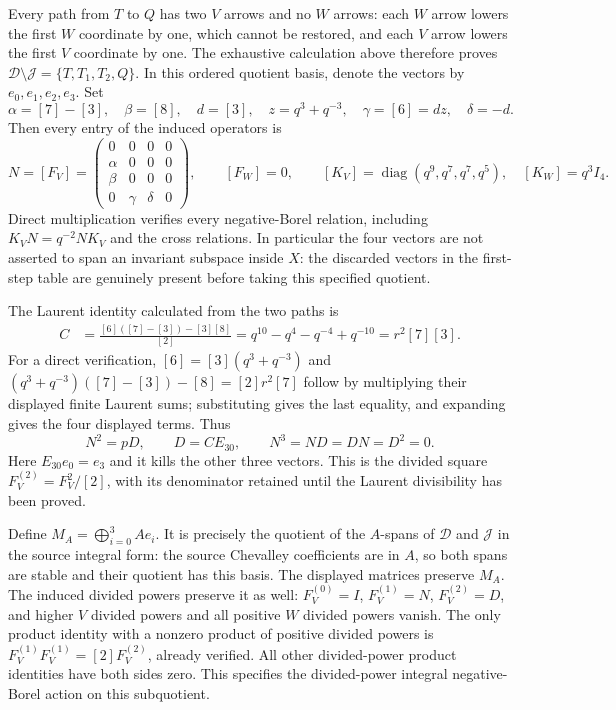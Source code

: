 Every path from $T$ to $Q$ has two $V$ arrows and no $W$ arrows:
each $W$ arrow lowers the first $W$ coordinate by one, which cannot
be restored, and each $V$ arrow lowers the first $V$ coordinate by
one. The exhaustive calculation above therefore proves
$\mathcal D\setminus\mathcal J=\{T,T_1,T_2,Q\}$.
In this ordered quotient basis, denote the vectors by $e_0,e_1,e_2,e_3$.
Set
\[
 \alpha=[7]-[3],\quad \beta=[8],\quad d=[3],\quad
 z=q^3+q^{-3},\quad\gamma=[6]=dz,\quad\delta=-d.
\]
Then every entry of the induced operators is
\[
 N=[F_V]=\begin{pmatrix}0&0&0&0\\
 \alpha&0&0&0\\ \beta&0&0&0\\0&\gamma&\delta&0\end{pmatrix},
 \qquad [F_W]=0,\qquad
 [K_V]=\operatorname{diag}(q^9,q^7,q^7,q^5),\quad[K_W]=q^3I_4.
\]
Direct multiplication verifies every negative-Borel relation, including
$K_VN=q^{-2}NK_V$ and the cross relations. In particular the four
vectors are not asserted to span an invariant subspace inside $X$:
the discarded vectors in the first-step table are genuinely present
before taking this specified quotient.

The Laurent identity calculated from the two paths is
\begin{align}
 C&=\frac{[6]([7]-[3])-[3][8]}{[2]}
   =q^{10}-q^4-q^{-4}+q^{-10}
   =r^2[7][3].\label{eq:gct-block-C}
\end{align}
For a direct verification, $[6]=[3](q^3+q^{-3})$ and
$(q^3+q^{-3})([7]-[3])-[8]=[2]r^2[7]$ follow by multiplying
their displayed finite Laurent sums; substituting gives the last
equality, and expanding gives the four displayed terms.
Thus
\[
 N^2=pD,\qquad D=CE_{30},\qquad N^3=ND=DN=D^2=0.
\]
Here $E_{30}e_0=e_3$ and it kills the other three vectors. This is
the divided square $F_V^{(2)}=F_V^2/[2]$, with its denominator retained
until the Laurent divisibility has been proved.

Define $M_A=\bigoplus_{i=0}^3Ae_i$. It is precisely the quotient of
the $A$-spans of $\mathcal D$ and $\mathcal J$ in the source integral
form: the source Chevalley coefficients are in $A$, so both spans
are stable and their quotient has this basis. The displayed matrices
preserve $M_A$. The induced divided powers preserve it as well:
$F_V^{(0)}=I$, $F_V^{(1)}=N$, $F_V^{(2)}=D$, and higher $V$ divided
powers and all positive $W$ divided powers vanish. The only product
identity with a nonzero product of positive divided powers is
$F_V^{(1)}F_V^{(1)}=[2]F_V^{(2)}$, already verified. All other
divided-power product identities have both sides zero. This specifies
the divided-power integral negative-Borel action on this subquotient.

